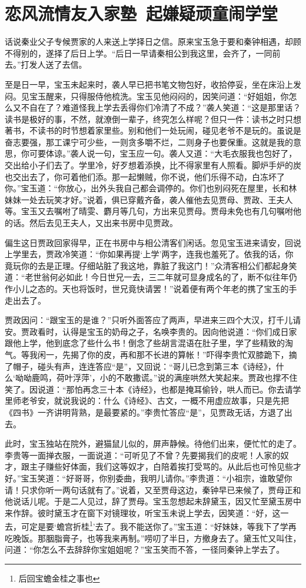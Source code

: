 \documentclass[12pt,oneside]{book}
\begin{document}
 
 \chapter{恋风流情友入家塾~起嫌疑顽童闹学堂}
话说秦业父子专候贾家的人来送上学择日之信。原来宝玉急于要和秦钟相遇，却顾不得别的，遂择了后日上学。“后日一早请秦相公到我这里，会齐了，一同前去。”打发人送了去信。

至是日一早，宝玉未起来时，袭人早已把书笔文物包好，收拾停妥，坐在床沿上发闷。见宝玉醒来，只得服侍他梳洗。宝玉见他闷闷的，因笑问道：“好姐姐，你怎么又不自在了？难道怪我上学去丢得你们冷清了不成？”袭人笑道：“这是那里话？读书是极好的事，不然，就潦倒一辈子，终究怎么样呢？但只一件：读书之时只想著书，不读书的时节想着家里些。别和他们一处玩闹，碰见老爷不是玩的。虽说是奋志要强，那工课宁可少些，一则贪多嚼不烂，二则身子也要保重。这就是我的意思，你可要体谅。”袭人说一句，宝玉应一句。袭人又道：“大毛衣服我也包好了，交出给小子们去了。学里冷，好歹想着添换，比不得家里有人照看。脚炉手炉的炭也交出去了，你可着他们添。那一起懒贼，你不说，他们乐得不动，白冻坏了你。”宝玉道：“你放心，出外头我自己都会调停的。你们也别闷死在屋里，长和林妹妹一处去玩笑才好。”说着，俱已穿戴齐备，袭人催他去见贾母、贾政、王夫人等。宝玉又去嘱咐了晴雯、麝月等几句，方出来见贾母。贾母未免也有几句嘱咐他的话。然后去见王夫人，又出来书房中见贾政。

偏生这日贾政回家得早，正在书房中与相公清客们闲话。忽见宝玉进来请安，回说上学里去，贾政冷笑道：“你如果再提‘上学’两字，连我也羞死了。依我的话，你竟玩你的去是正理。仔细站脏了我这地，靠脏了我这门！”众清客相公们都起身笑道：“老世翁何必如此！今日世兄一去，三二年就可显身成名的了，断不似往年仍作小儿之态的。天也将饭时，世兄竟快请罢！”说着便有两个年老的携了宝玉的手走出去了。

贾政因问：“跟宝玉的是谁？”只听外面答应了两声，早进来三四个大汉，打千儿请安。贾政看时，认得是宝玉的奶母之子，名唤李贵的。因向他说道：“你们成日家跟他上学，他到底念了些什么书！倒念了些胡言混语在肚子里，学了些精致的淘气。等我闲一，先揭了你的皮，再和那不长进的算帐！”吓得李贵忙双膝跪下，摘了帽子，碰头有声，连连答应“是”，又回说：“哥儿已念到第三本《诗经》，什么‘呦呦鹿鸣，荷叶浮萍’，小的不敢撒谎。”说的满座哄然大笑起来。贾政也撑不住笑了。因说道：“那怕再念三十本《诗经》，也都是掩耳偷铃，哄人而已。你去请学里师老爷安，就说我说的：什么《诗经》、古文，一概不用虚应故事，只是先把《四书》一齐讲明背熟，是最要紧的。”李贵忙答应“是”，见贾政无话，方退了出去。

此时，宝玉独站在院外，避猫鼠儿似的，屏声静候。待他们出来，便忙忙的走了。李贵等一面掸衣服，一面说道：“可听见了不曾？先要揭我们的皮呢！人家的奴才，跟主子赚些好体面，我们这等奴才，白陪着挨打受骂的。从此后也可怜见些才好。”宝玉笑道：“好哥哥，你别委曲，我明儿请你。”李贵道：“小祖宗，谁敢望你请！只求你听一两句话就有了。”说着，又至贾母这边，秦钟早已来候了，贾母正和他说话儿呢。于是二人见过，辞了贾母。宝玉忽想起未辞黛玉，因又忙至黛玉房中来作辞。彼时黛玉才在窗下对镜理妆，听宝玉未说上学去，因笑道：“好，这一去，可定是要‘蟾宫折桂\footnote{后回宝蟾金桂之事也}’去了。我不能送你了。”宝玉道：“好妹妹，等我下了学再吃晚饭。那胭脂膏子，也等我来再制。”唠叨了半日，方撤身去了。黛玉忙又叫住，问道：“你怎么不去辞辞你宝姐姐呢？”宝玉笑而不答，一径同秦钟上学去了。
\end{document}
